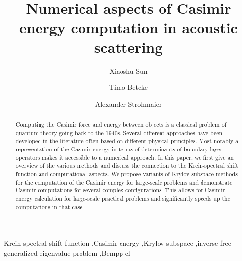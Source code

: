 \documentclass[review]{elsarticle}
\begin{document}
\begin{frontmatter}

\title{Numerical aspects of Casimir energy computation in acoustic scattering}


\author[mymainaddress]{Xiaoshu Sun}

\author[mymainaddress]{Timo Betcke}
\address[mymainaddress]{Department of Mathematics, University College London, London, WC1E 6BT, UK}

\author[mysecondaryaddress]{Alexander Strohmaier}
\address[mysecondaryaddress]{School of Mathematics, University of Leeds, Leeds, LS2 9JT, UK}




\begin{abstract}
    Computing the Casimir force and energy between objects is a classical problem of quantum theory going back to the 1940s. 
    Several different approaches have been developed in the literature often based on different physical principles. Most notably a representation 
    of the Casimir energy in terms of determinants of boundary layer operators makes it accessible to a numerical approach. In this paper, we first give 
    an overview of the various methods and discuss the connection to the Krein-spectral shift function and computational aspects.
    We propose variants of Krylov subspace methods for the computation of the Casimir energy for large-scale problems and demonstrate Casimir computations 
    for several complex configurations. This allows for Casimir energy calculation for large-scale practical problems and significantly speeds up the computations in that 
    case.
   \end{abstract}

\begin{keyword}
Krein spectral shift function \sep Casimir energy \sep Krylov subspace \sep inverse-free generalized eigenvalue problem \sep Bempp-cl
\end{keyword}

\end{frontmatter}
\end{document}
